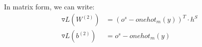 \documentclass[12pt]{article}
\begin{document}
\subsection{}
In matrix form, we can write:
\begin{align*}
\triangledown L(W^{(2)}) & = (o^s-onehot_m(y))^T \cdot h^S \\
\triangledown L(b^{(2)}) & = o^s-onehot_m(y)
\end{align*}
\subsection{}
\subsection{}
\subsection{}
\subsection{}
\subsection{}
\subsection{}
\subsection{}
\end{document}
